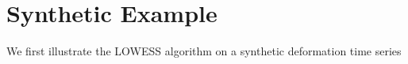 %



%





\section{Synthetic Example}

%

We first illustrate the LOWESS algorithm on a synthetic deformation time series


